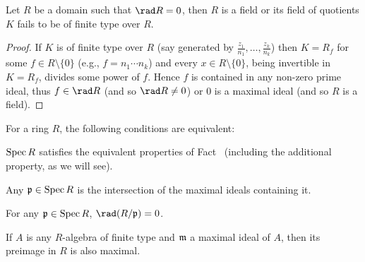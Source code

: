 \documentclass[a4paper,parskip=half,numbers=enddot, DIV=12]{scrreprt}
\begin{document}
\begin{lem}
    Let $R$ be a domain such that $\rad R = 0$, then $R$ is a field or its field of quotients $K$ fails to be of finite type over $R$.
\end{lem}
\begin{proof}
    If $K$ is of finite type over $R$ (say generated by $\frac{z_1}{n_1},\ldots,\frac{z_k}{n_k}$) then $K= R_f$ for some $f\in R\setminus \{0\}$ (e.g., $f = n_1\cdots n_k$) and every $x\in R\setminus \{0\}$, being invertible in $K=R_f$, divides some power of $f$. Hence $f$ is contained in any non-zero prime ideal, thus $f\in\rad R$ (and so $\rad R\neq 0$) or $0$ is a maximal ideal (and so $R$ is a field).
\end{proof}
\begin{prop}
    For a ring $R$, the following conditions are equivalent:
    \begin{alphanumerate}
    \item 
        $\operatorname{Spec} R$ satisfies the equivalent properties of Fact~ (including the additional property, as we will see).
    \item  
        Any $\mathfrak{p}\in \operatorname{Spec} R$ is the intersection of the maximal ideals containing it.
    \item 
        For any $\mathfrak{p}\in \operatorname{Spec} R$, $\rad(R/\pp) = 0$.
    \item  
        If $A$ is any $R$-algebra of finite type and $\mathfrak{m}$ a maximal ideal of $A$, then its preimage in $R$ is also maximal.
    \end{alphanumerate}
\end{prop}
\end{document}

